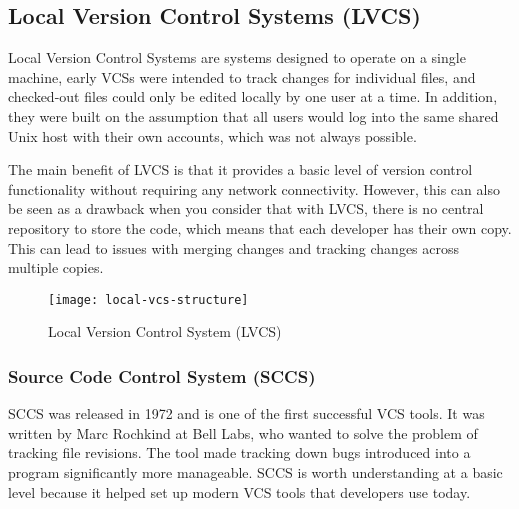 \subsection{Local Version Control Systems (LVCS)}
Local Version Control Systems are systems designed to operate on a single machine, early VCSs were intended to track changes for individual files, and checked-out files could only be edited locally by one user at a time. In addition, they were built on the assumption that all users would log into the same shared Unix host with their own accounts, which was not always possible.

The main benefit of LVCS is that it provides a basic level of version control functionality without requiring any network connectivity. However, this can also be seen as a drawback when you consider that with LVCS, there is no central repository to store the code, which means that each developer has their own copy. This can lead to issues with merging changes and tracking changes across multiple copies.

\begin{figure}[htbp]
    \centering
    \texttt{[image: local-vcs-structure]}
    \caption{Local Version Control System (LVCS)}
    \label{fig:lvcs-structure}
\end{figure}

\subsubsection{Source Code Control System (SCCS)}
SCCS was released in 1972 and is one of the first successful VCS tools. It was written by Marc Rochkind at Bell Labs, who wanted to solve the problem of tracking file revisions. The tool made tracking down bugs introduced into a program significantly more manageable. SCCS is worth understanding at a basic level because it helped set up modern VCS tools that developers use today.
